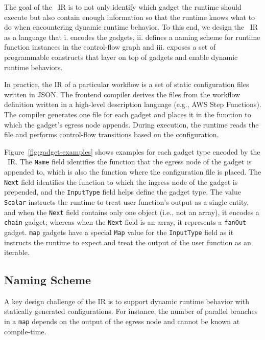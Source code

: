 The goal of the \name{}~IR is to not only identify which gadget the \name{}
runtime should execute but also contain enough information so that the \name{}
runtime knows what to do when encountering dynamic runtime behavior. To this
end, we design the \name{}~IR as a language that i. encodes the gadgets, ii.
defines a naming scheme for runtime function instances in the control-flow
graph and iii. exposes a set of programmable constructs that layer on top of
gadgets and enable dynamic runtime behaviors.

In practice, the IR of a particular workflow is a set of static configuration
files written in JSON. The frontend compiler derives the files from the
workflow definition written in a high-level description language (e.g., AWS
Step Functions). The compiler generates one file for each gadget and places it
in the function to which the gadget's egress node appends. During execution,
the \name{} runtime reads the file and performs control-flow transitions based
on the configuration.


Figure~\ref{fig:gadget-examples} shows examples for each gadget type encoded
by the \name{}~IR. The \texttt{Name} field identifies the function that the
egress node of the gadget is appended to, which is also the function where the
configuration file is placed. The \texttt{Next} field identifies the function
to which the ingress node of the gadget is prepended, and the
\texttt{InputType} field helps define the gadget type. The value
\texttt{Scalar} instructs the runtime to treat user function's output as a
single entity, and when the \texttt{Next} field contains only one object
(i.e., not an array), it encodes a \texttt{chain} gadget; whereas when the
\texttt{Next} field is an array, it represents a \texttt{fanOut} gadget.
\texttt{map} gadgets have a special \texttt{Map} value for the
\texttt{InputType} field as it instructs the runtime to expect and treat the
output of the user function as an iterable.

\subsection{Naming Scheme}\label{sec:ir:naming}

A key design challenge of the \name{} IR is to support dynamic runtime
behavior with statically generated configurations. For instance, the number of
parallel branches in a \texttt{map} depends on the output of the egress node
and cannot be known at compile-time. 


